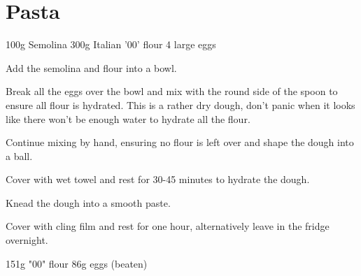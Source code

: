 \chapter{Pasta}
\minitoc

\label{rec:egg-pasta}

\begin{ingreds}
	100g Semolina
	300g Italian '00' flour
	4 large eggs
\end{ingreds}

\begin{method}		
     	Add the semolina and flour into a bowl.

	Break all the eggs over the bowl and mix with the round side of the spoon to ensure all flour is hydrated.  This is a rather dry dough, don't panic when it looks like there won't be enough water to hydrate all the flour.

	Continue mixing by hand, ensuring no flour is left over and shape the dough into a ball.

	Cover with wet towel and rest for 30-45 minutes to hydrate the dough.

	Knead the dough into a smooth paste.

	Cover with cling film and rest for one hour, alternatively leave in the fridge overnight.

\end {method}

\label{rec:pasta-sfoglia-uovo}

\begin{ingreds}
	151g "00" flour
	86g eggs (beaten)

\end{ingreds}

